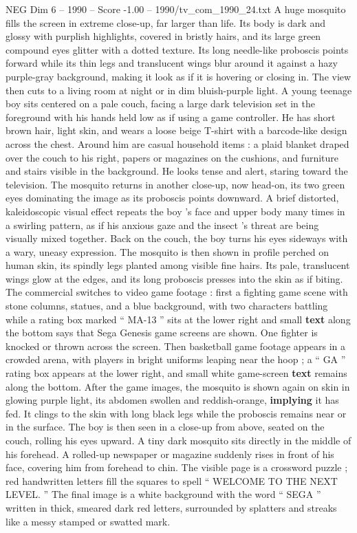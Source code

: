 \begin{textsample}{NEG Dim 6 – 1990 – Score -1.00 – 1990/tv\_com\_1990\_24.txt}  \label{ex:f6_neg_028}
A huge mosquito fills the screen in extreme close-up, far larger than life.
Its body is dark and glossy with purplish highlights, covered in bristly hairs, and its large green compound eyes glitter with a dotted texture.
Its long needle-like proboscis points forward while its thin legs and translucent wings blur around it against a hazy purple-gray background, making it look as if it is hovering or closing in.
The view then cuts to a living room at night or in dim bluish-purple light.
A young teenage boy sits centered on a pale couch, facing a large dark television set in the foreground with his hands held low as if using a game controller.
He has short brown hair, light skin, and wears a loose beige T-shirt with a barcode-like design across the chest.
Around him are casual household items : a plaid blanket draped over the couch to his right, papers or magazines on the cushions, and furniture and stairs visible in the background.
He looks tense and alert, staring toward the television.
The mosquito returns in another close-up, now head-on, its two green eyes dominating the image as its proboscis points downward.
A brief distorted, kaleidoscopic visual effect repeats the boy ’s face and upper body many times in a swirling pattern, as if his anxious gaze and the insect ’s threat are being visually mixed together.
Back on the couch, the boy turns his eyes sideways with a wary, uneasy expression.
The mosquito is then shown in profile perched on human skin, its spindly legs planted among visible fine hairs.
Its pale, translucent wings glow at the edges, and its long proboscis presses into the skin as if biting.
The commercial switches to video game footage : first a fighting game scene with stone columns, statues, and a blue background, with two characters battling while a rating box marked “ MA-13 ” sits at the lower right and small \textbf{text} along the bottom says that Sega Genesis game screens are shown.
One fighter is knocked or thrown across the screen.
Then basketball game footage appears in a crowded arena, with players in bright uniforms leaping near the hoop ; a “ GA ” rating box appears at the lower right, and small white game-screen \textbf{text} remains along the bottom.
After the game images, the mosquito is shown again on skin in glowing purple light, its abdomen swollen and reddish-orange, \textbf{implying} it has fed.
It clings to the skin with long black legs while the proboscis remains near or in the surface.
The boy is then seen in a close-up from above, seated on the couch, rolling his eyes upward.
A tiny dark mosquito sits directly in the middle of his forehead.
A rolled-up newspaper or magazine suddenly rises in front of his face, covering him from forehead to chin.
The visible page is a crossword puzzle ; red handwritten letters fill the squares to spell “ WELCOME TO THE NEXT LEVEL. ” The final image is a white background with the word “ SEGA ” written in thick, smeared dark red letters, surrounded by splatters and streaks like a messy stamped or swatted mark.

\end{textsample}
